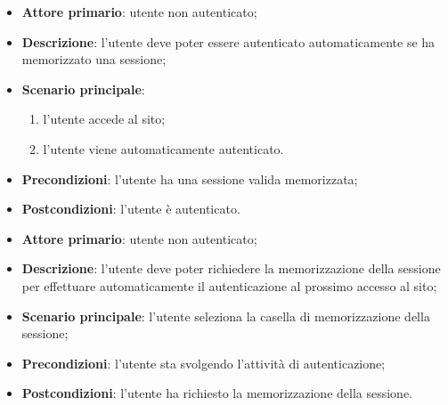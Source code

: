 \label{uc:login_automatico}
\begin{itemize}
    \item \textbf{Attore primario}: utente non autenticato;
    \item \textbf{Descrizione}: l'utente deve poter essere autenticato automaticamente se ha memorizzato una sessione;
    \item \textbf{Scenario principale}:
    \begin{enumerate}
        \item l'utente accede al sito;
        \item l'utente viene automaticamente autenticato.
    \end{enumerate}
    \item \textbf{Precondizioni}: l'utente ha una sessione valida memorizzata;
    \item \textbf{Postcondizioni}: l'utente è autenticato.
\end{itemize}

\label{uc:login_ricordami}
\begin{itemize}
    \item \textbf{Attore primario}: utente non autenticato;
    \item \textbf{Descrizione}: l'utente deve poter richiedere la memorizzazione della sessione per effettuare automaticamente il autenticazione al prossimo accesso al sito;
    \item \textbf{Scenario principale}: l'utente seleziona la casella di memorizzazione della sessione;
    \item \textbf{Precondizioni}: l'utente sta svolgendo l'attività di autenticazione;
    \item \textbf{Postcondizioni}: l'utente ha richiesto la memorizzazione della sessione.
\end{itemize}

